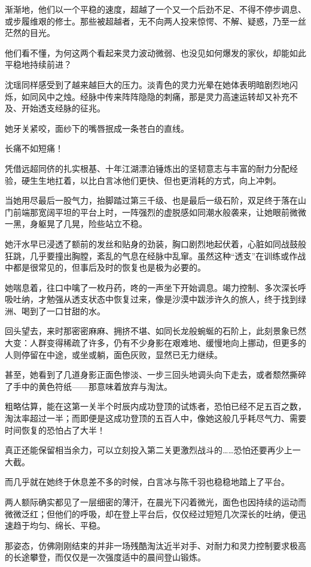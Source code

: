 渐渐地，他们以一个平稳的速度，超越了一个又一个后劲不足、不得不停步调息、或步履维艰的修士。那些被超越者，无不向两人投来惊愕、不解、疑惑，乃至一丝茫然的目光。

他们看不懂，为何这两个看起来灵力波动微弱、也没见如何爆发的家伙，却能如此平稳地持续前进？

沈瑶同样感受到了越来越巨大的压力。淡青色的灵力光晕在她体表明暗剧烈地闪烁，如同风中之烛。经脉中传来阵阵隐隐的刺痛，那是灵力高速运转却又补充不及、开始透支经脉的征兆。

她牙关紧咬，面纱下的嘴唇抿成一条苍白的直线。

长痛不如短痛！

凭借远超同侪的扎实根基、十年江湖漂泊锤炼出的坚韧意志与丰富的耐力分配经验，硬生生地扛着，以比白言冰他们更快、但也更消耗的方式，向上冲刺。

当她用尽最后一股气力，抬脚踏过第三千级、也是最后一级石阶，双足终于落在山门前端那宽阔平坦的平台上时，一阵强烈的虚脱感如同潮水般袭来，让她眼前微微一黑，身躯晃了几晃，险些站立不稳。

她汗水早已浸透了额前的发丝和贴身的劲装，胸口剧烈地起伏着，心脏如同战鼓般狂跳，几乎要撞出胸膛，紊乱的气息在经脉中乱窜。虽然这种“透支”在训练或作战中都是很常见的，但事后及时的恢复也是极为必要的。

她喘息着，往口中噙了一枚丹药，咚的一声坐下开始调息。竭力控制、多次深长呼吸吐纳，才勉强从透支状态中恢复过来，像是沙漠中跋涉许久的旅人，终于找到绿洲、喝到了一口甘甜的水。

回头望去，来时那密密麻麻、拥挤不堪、如同长龙般蜿蜒的石阶上，此刻景象已然大变：人群变得稀疏了许多，仍有不少身影在艰难地、缓慢地向上挪动，但更多的人则停留在中途，或坐或躺，面色灰败，显然已无力继续。

甚至，她看到了几道身影正面色惨淡、一步三回头地调头向下走去，或者颓然撕碎了手中的黄色符纸——那意味着放弃与淘汰。

粗略估算，能在这第一关半个时辰内成功登顶的试炼者，恐怕已经不足五百之数，淘汰率超过一半；而即便是这成功登顶的五百人中，像她这般几乎耗尽气力、需要时间恢复的恐怕占了大半！

真正还能保留相当余力，可以立刻投入第二关更激烈战斗的……恐怕还要再少上一大截。

而几乎就在她终于休息差不多的时候，白言冰与陈千羽也稳稳地踏上了平台。

两人额际确实都见了一层细密的薄汗，在晨光下闪着微光，面色也因持续的运动而微微泛红；但他们的呼吸，却在登上平台后，仅仅经过短短几次深长的吐纳，便迅速趋于均匀、绵长、平稳。

那姿态，仿佛刚刚结束的并非一场残酷淘汰近半对手、对耐力和灵力控制要求极高的长途攀登，而仅仅是一次强度适中的晨间登山锻炼。

